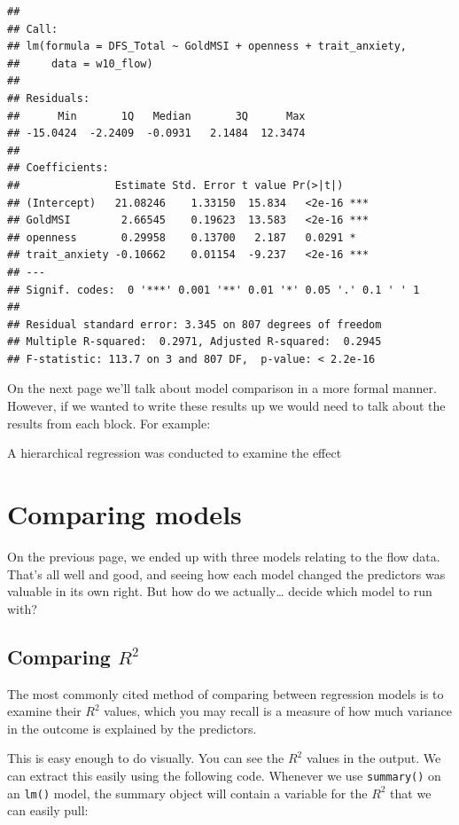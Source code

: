 \documentclass[
]{book}
\begin{document}
\begin{verbatim}
## 
## Call:
## lm(formula = DFS_Total ~ GoldMSI + openness + trait_anxiety, 
##     data = w10_flow)
## 
## Residuals:
##      Min       1Q   Median       3Q      Max 
## -15.0424  -2.2409  -0.0931   2.1484  12.3474 
## 
## Coefficients:
##               Estimate Std. Error t value Pr(>|t|)    
## (Intercept)   21.08246    1.33150  15.834   <2e-16 ***
## GoldMSI        2.66545    0.19623  13.583   <2e-16 ***
## openness       0.29958    0.13700   2.187   0.0291 *  
## trait_anxiety -0.10662    0.01154  -9.237   <2e-16 ***
## ---
## Signif. codes:  0 '***' 0.001 '**' 0.01 '*' 0.05 '.' 0.1 ' ' 1
## 
## Residual standard error: 3.345 on 807 degrees of freedom
## Multiple R-squared:  0.2971, Adjusted R-squared:  0.2945 
## F-statistic: 113.7 on 3 and 807 DF,  p-value: < 2.2e-16
\end{verbatim}

On the next page we'll talk about model comparison in a more formal manner. However, if we wanted to write these results up we would need to talk about the results from each block. For example:

A hierarchical regression was conducted to examine the effect

\hypertarget{comparing-models}{%
\section{Comparing models}\label{comparing-models}}

On the previous page, we ended up with three models relating to the flow data. That's all well and good, and seeing how each model changed the predictors was valuable in its own right. But how do we actually\ldots{} decide which model to run with?

\hypertarget{comparing-r2}{%
\subsection{\texorpdfstring{Comparing \(R^2\)}{Comparing R\^{}2}}\label{comparing-r2}}

The most commonly cited method of comparing between regression models is to examine their \(R^2\) values, which you may recall is a measure of how much variance in the outcome is explained by the predictors.

This is easy enough to do visually. You can see the \(R^2\) values in the output. We can extract this easily using the following code. Whenever we use \texttt{summary()} on an \texttt{lm()} model, the summary object will contain a variable for the \(R^2\) that we can easily pull:
\end{document}
